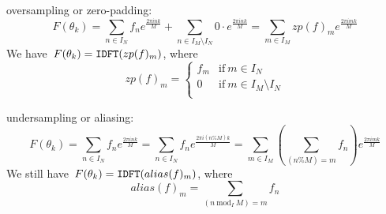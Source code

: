  oversampling or zero-padding:
\[
	F(\theta_k)
	=
	\sum_{n\in I_N}f_ne^{\frac{2\pi ink}{M}}
	+
	\sum_{n\in I_M\setminus I_N} 0\cdot e^{\frac{2\pi ink}{M}}
	=
	\sum_{m\in I_M}zp(f)_me^{\frac{2\pi imk}{M}}
\]
We have~$F(\theta_k) = \mathtt{IDFT}(zp(f)_m)$, where
\[
	zp(f)_m = \begin{cases}
		f_m & \mathrm{if}\ m\in I_N \\
		0 & \mathrm{if}\ m\in I_M\setminus I_N \\
	\end{cases}
\]

 undersampling or aliasing:
\[
	F(\theta_k)
	=
	\sum_{n\in I_N}f_ne^{\frac{2\pi ink}{M}}
	=
	\sum_{n\in I_N}f_ne^{\frac{2\pi i(n\% M)k}{M}}
	=
	\sum_{m\in I_M}\left(\sum_{(n\%M)=m}f_n\right)e^{\frac{2\pi imk}{M}}
\]
We still have~$F(\theta_k)=\mathtt{IDFT}(alias(f)_m)$, where
\[
	alias(f)_m=\sum_{(n\ \mathrm{mod}_I\  M)=m} f_n
\]


